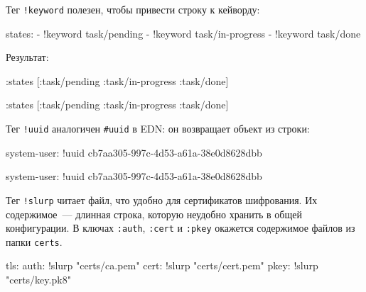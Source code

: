 \noindent
Тег \verb|!keyword| полезен, чтобы привести строку к кейворду:

\begin{english}
  \begin{yaml}
states:
  - !keyword task/pending
  - !keyword task/in-progress
  - !keyword task/done
  \end{yaml}
\end{english}

\noindent
Результат:

\ifnarrow

\begin{english}
  \begin{clojure}
{:states [:task/pending
          :task/in-progress
          :task/done]}
  \end{clojure}
\end{english}

\else

\begin{english}
  \begin{clojure}
{:states [:task/pending :task/in-progress :task/done]}
  \end{clojure}
\end{english}

\fi

Тег \verb|!uuid| аналогичен \verb|#uuid| в EDN: он возвращает объект
 из строки:

\ifnarrow

\begin{english}
  \begin{yaml}
system-user: !uuid
    cb7aa305-997c-4d53-a61a-38e0d8628dbb
  \end{yaml}
\end{english}

\else

\begin{english}
  \begin{yaml}
system-user: !uuid cb7aa305-997c-4d53-a61a-38e0d8628dbb
  \end{yaml}
\end{english}

\fi

Тег \verb|!slurp| читает файл, что удобно для сертификатов шифрования. Их
содержимое~--- длинная строка, которую неудобно хранить в общей конфигурации. В
ключах \verb|:auth|, \verb|:cert| и \verb|:pkey| окажется содержимое файлов из
папки \verb|certs|.

\begin{english}
  \begin{yaml}
tls:
  auth: !slurp "certs/ca.pem"
  cert: !slurp "certs/cert.pem"
  pkey: !slurp "certs/key.pk8"
  \end{yaml}
\end{english}

